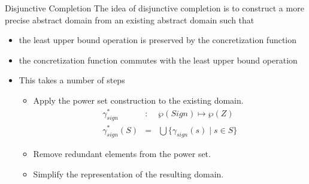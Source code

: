 \documentclass{beamer}
\begin{document}
\begin{frame}{Disjunctive Completion} 
The idea of disjunctive completion is to construct a more precise abstract domain from an existing abstract domain such that
\begin{itemize}[<+->]
\item the least upper bound operation is preserved by the concretization function
\item the concretization function commutes with the least upper bound operation
\item This takes a number of steps
\begin{itemize}
\item Apply the power set construction  to the existing domain. 
      \begin{eqnarray*} \gamma_{sign}^* &: & \wp(Sign) \mapsto \wp(Z) \\ 
            \gamma_{sign}^* (S) &= & \bigcup \{ \gamma_{sign}(s) \mid s\in S\} 
      \end{eqnarray*}  
\item Remove redundant elements from the power set.
\item Simplify the representation of the resulting domain. 
\end{itemize}
\end{itemize}
\end{frame}
\end{document}

